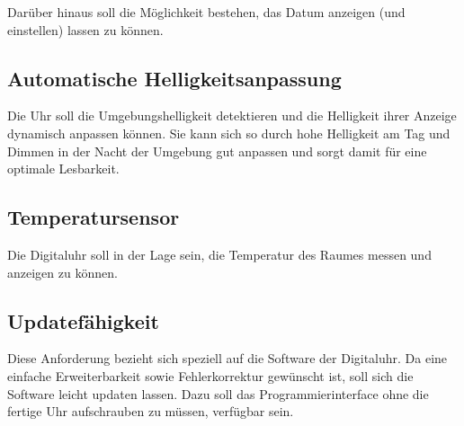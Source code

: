 Darüber hinaus soll die Möglichkeit bestehen, das Datum anzeigen (und einstellen) lassen zu können.
%
\subsection{Automatische Helligkeitsanpassung}
Die Uhr soll die Umgebungshelligkeit detektieren und die Helligkeit ihrer Anzeige dynamisch anpassen können. Sie kann sich so
durch hohe Helligkeit am Tag und Dimmen in der Nacht der Umgebung gut anpassen und sorgt damit für eine optimale Lesbarkeit.
%
\subsection{Temperatursensor}
Die Digitaluhr soll in der Lage sein, die Temperatur des Raumes messen und anzeigen zu können.
%
\subsection{Updatefähigkeit}
Diese Anforderung bezieht sich speziell auf die Software der Digitaluhr. Da eine einfache Erweiterbarkeit sowie Fehlerkorrektur
gewünscht ist, soll sich die Software leicht updaten lassen. Dazu soll das Programmierinterface ohne die fertige Uhr
aufschrauben zu müssen, verfügbar sein.
%